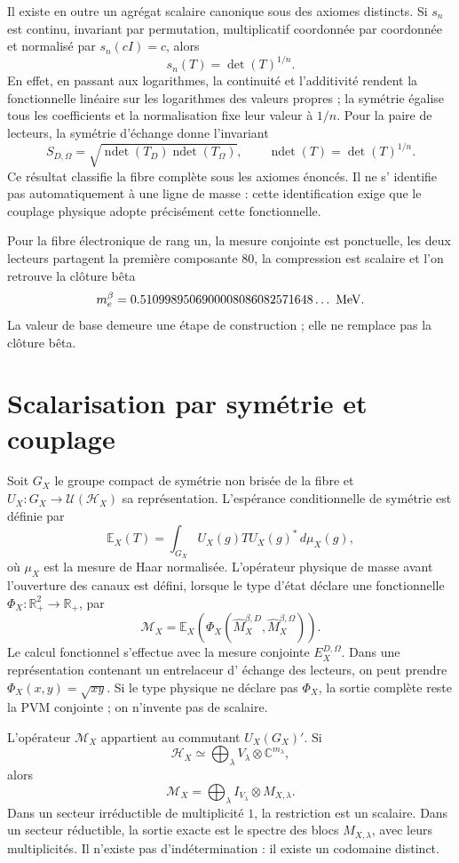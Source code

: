 Il existe en outre un agrégat scalaire canonique sous des axiomes distincts. Si
\(s_n\) est continu, invariant par permutation, multiplicatif coordonnée par
coordonnée et normalisé par \(s_n(cI)=c\), alors
\[
 s_n(T)=\det(T)^{1/n}.
\]
En effet, en passant aux logarithmes, la continuité et l'additivité rendent la
fonctionnelle linéaire sur les logarithmes des valeurs propres ; la symétrie égalise tous
les coefficients et la normalisation fixe leur valeur à \(1/n\). Pour la paire de
lecteurs, la symétrie d'échange donne l'invariant
\[
 S_{D,\Omega}
 =\sqrt{
 \operatorname{ndet}(T_D)\operatorname{ndet}(T_\Omega)},
 \qquad
 \operatorname{ndet}(T)=\det(T)^{1/n}.
\]
Ce résultat classifie la fibre complète sous les axiomes énoncés. Il ne s'
identifie pas automatiquement à une ligne de masse : cette identification exige
que le couplage physique adopte précisément cette fonctionnelle.

Pour la fibre électronique de rang un, la mesure conjointe est ponctuelle, les deux
lecteurs partagent la première composante \(80\), la compression est scalaire et l'on
retrouve la clôture bêta
\[
 m_e^\beta
 =0.5109989506900008086082571648\ldots\ {\rm MeV}.
\]
La valeur de base demeure une étape de construction ; elle ne remplace pas la clôture
bêta.

\section{Scalarisation par symétrie et couplage}

Soit \(G_X\) le groupe compact de symétrie non brisée de la fibre et
\(U_X:G_X\to\mathcal U(\mathcal H_X)\) sa représentation. L'espérance
conditionnelle de symétrie est définie par
\[
 \mathbb E_X(T)
 =\int_{G_X}U_X(g)TU_X(g)^*\,d\mu_X(g),
\]
où \(\mu_X\) est la mesure de Haar normalisée. L'opérateur physique de masse
avant l'ouverture des canaux est défini, lorsque le type d'état déclare une
fonctionnelle \(\Phi_X:\mathbb R_+^2\to\mathbb R_+\), par
\[
 \mathcal M_X
 =\mathbb E_X\!\left(
   \Phi_X(\widehat M_X^{\beta,D},\widehat M_X^{\beta,\Omega})
  \right).
\]
Le calcul fonctionnel s'effectue avec la mesure conjointe
\(E_X^{D,\Omega}\). Dans une représentation contenant un entrelaceur d'
échange des lecteurs, on peut prendre \(\Phi_X(x,y)=\sqrt{xy}\). Si le type
physique ne déclare pas \(\Phi_X\), la sortie complète reste la PVM conjointe ;
on n'invente pas de scalaire.

\begin{theorem}
L'opérateur \(\mathcal M_X\) appartient au commutant
\(U_X(G_X)'\). Si
\[
 \mathcal H_X\simeq
 \bigoplus_\lambda V_\lambda\otimes\mathbb C^{m_\lambda},
\]
alors
\[
 \mathcal M_X=
 \bigoplus_\lambda I_{V_\lambda}\otimes M_{X,\lambda}.
\]
Dans un secteur irréductible de multiplicité \(1\), la restriction est un scalaire.
Dans un secteur réductible, la sortie exacte est le spectre des blocs
\(M_{X,\lambda}\), avec leurs multiplicités. Il n'existe pas d'indétermination :
il existe un codomaine distinct.
\end{theorem}

